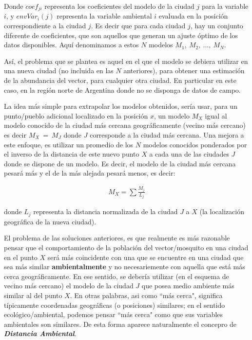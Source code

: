   \par Donde $coef_{ji}$ representa los coeficientes del modelo de la
    ciudad $j$ para la variable $i$, y $envVar_{i}(j)$ representa la variable
    ambiental $i$ evaluada en la posición correspondiente a la ciudad $j$.
    Es decir que para cada ciudad $j$, hay un conjunto diferente de
    coeficientes, que son aquellos que generan un ajuste óptimo de los datos
    disponibles. Aquí denominamos a estos $N$ modelos $M_{1},\ M_{2},\ \dots,\ M_{N}$.


  \par Así, el problema que se plantea es aquel en el que el modelo se
    debiera utilizar en una nueva ciudad (no incluida en las $N$ anteriores),
    para obtener una estimación de la abundancia del vector, para cualquier otra
    ciudad. En particular en este caso, en la región norte de Argentina donde
    no se disponga de datos de campo.


  \par La idea más simple para extrapolar los modelos obtenidos, sería usar,
    para un punto/pueblo adicional localizado en la posición $x$, un modelo $M_{X}$
    igual al modelo conocido de la ciudad más cercana geográficamente (vecino más cercano) es
    decir $M_{X}\ =\ M_{J}$ donde $J$ corresponde a la ciudad más cercana.
    Una mejora a este enfoque, es utilizar un promedio de los $N$ modelos conocidos
    ponderados por el inverso de la distancia de este nuevo punto $X$ a cada una
    de las ciudades $J$ donde se dispone de un modelo. Es decir, el modelo de la
    ciudad más cercana pesará más y el de la más alejada pesará menos, es decir:

    \begin{align}
      M_{X} = \sum{}{\frac{M_{j}}{L_{j}}} \label{Eq:dist}
    \end{align}

    donde $L_{j}$ representa la distancia normalizada de la ciudad $J$ a
    $X$ (la localización geográfica de la nueva ciudad).


  \par El problema de las soluciones anteriores, es que realmente es más
    razonable pensar que el comportamiento de la población del vector/mosquito
    en una ciudad en el punto $X$ será más coincidente con una que se encuentre
    en una ciudad que sea más similar \textbf{ambientalmente} y no necesariemente
    con aquella que está más cerca geográficamente. En ese sentido, se debería
    utilizar (en el esquema de vecino más cercano) el modelo de la ciudad $J$
    que posea medio ambiente más similar al del punto $X$. En otras palabras,
    asi como ``más cerca", significa típicamente coordenadas geográficas (o posiciones)
    similares; en el sentido ecológico/ambiental, podemos pensar ``más cerca"
    como que sus variables ambientales son similares. De esta forma aparece
    naturalmente el concepro de \textbf{\textit{Distancia Ambiental}}.

